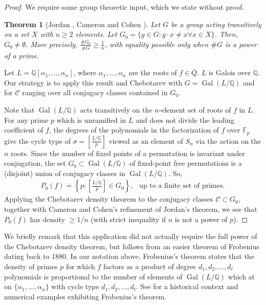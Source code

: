 \documentclass[12pt]{amsart}
\newtheorem{thm}{Theorem}[section]
\theoremstyle{definition}
\theoremstyle{remark}
\numberwithin{equation}{section}
\newcommand{\cC}{\mathcal C}
\newcommand{\bbF}{\mathbb F}
\newcommand{\bbQ}{\mathbb Q}
\newcommand{\artin}[2]{\left[ \frac{#1}{#2}\right]}
\DeclareMathOperator{\Gal}{Gal}
\begin{document}
\begin{proof}
We require some group theoretic input, which we state without proof.
\begin{thm}[Jordan \cite{Jordan72}, Cameron and Cohen \cite{CameronCohen92}] \label{thm:JordansTheorem}
Let $G$ be a group acting transitively on a set $X$ with $n \geq 2$ elements. Let $G_{0} = \{g \in G: g\cdot x \neq x \forall x \in X\}$. Then, $G_{0} \neq \emptyset$. More precisely, $\frac{\# G_{0}}{\# G} \geq \frac{1}{n}$, with equality possible only when $\# G$ is a power of a prime.
\end{thm}
Let $L = \bbQ[\alpha_{1}, \dots, \alpha_{n}]$, where $\alpha_{1}, \dots, \alpha_{n}$ are the roots of $f \in \overline{Q}$. $L$ is Galois over $\bbQ$. Our strategy is to apply this result and Chebotarev with $G = \Gal(L/\bbQ)$ and for $\cC$ ranging over all conjugacy classes contained in $G_{0}$.

Note that $\Gal(L/\bbQ)$ acts transitively on the $n$-element set of roots of $f$ in $L$. For any prime $p$ which is unramified in $L$ and does not divide the leading coefficient of $f$, the degrees of the polynomials in the factorization of $f$ over $\bbF_{p}$ give the cycle type of $\sigma = \artin{L/\bbQ}{p}$ viewed as an element of $S_{n}$ via the action on the $n$ roots. Since the number of fixed points of a permutation is invariant under conjugation, the set $G_{0} \subset \Gal(L/\bbQ)$ of fixed-point free permutations is a (disjoint) union of conjugacy classes in $\Gal(L/\bbQ)$. So,
\begin{align}
P_{0}(f) \overset{\cdot}{=} \left\{ p: \artin{L/\bbQ}{p} \in G_{0}\right\}, \ \ \text{ up to a finite set of primes}.
\end{align}
Applying the Chebotarev density theorem to the conjugacy classes $\cC \subset G_{0}$, together with Cameron and Cohen's refinement of Jordan's theorem, we see that $P_{0}(f)$ has density $\geq 1/n$ (with strict inequality if $n$ is not a power of $p$).
\end{proof}

We briefly remark that this application did not actually require the full power of the Chebotarev density theorem, but follows from an easier theorem of Frobenius dating back to 1880. In our notation above, Frobenius's theorem states that the density of primes $p$ for which $f$ factors as a product of degree $d_1, d_2, \dots, d_t$ polynomials is proportional to the number of elements of $\Gal(L/\bbQ)$ which at on $\{\alpha_{1}, \dots, \alpha_{n}\}$ with cycle type $d_1, d_2, \dots, d_t$. See \cite{StevenhagenLenstra96} for a historical context and numerical examples exhibiting Frobenius's theorem.
\end{document}
